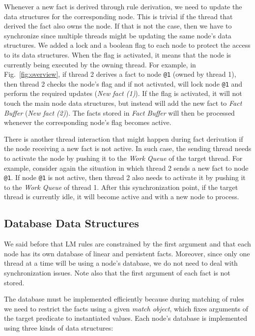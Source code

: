 Whenever a new fact is derived through rule derivation, we need to
update the data structures for the corresponding node. This is trivial
if the thread that derived the fact also owns the node. If that is not
the case, then we have to synchronize since multiple threads might be
updating the same node's data structures. We added a lock and a
boolean flag to each node to protect the access to its data
structures. When the flag is activated, it means that the node is
currently being executed by the owning thread. For example, in
Fig.~\ref{fig:overview}, if thread 2 derives a fact to
node \texttt{@1} (owned by thread 1), then thread 2 checks the node's
flag and if not activated, will lock node \texttt{@1} and perform the
required updates (\emph{New fact (1)}). If the flag is activated, it
will not touch the main node data structures, but instead will add the
new fact to \emph{Fact Buffer} (\emph{New fact (2)}). The facts stored
in \emph{Fact Buffer} will then be processed whenever the
corresponding node's flag becomes active.

There is another thread interaction that might happen during fact
derivation if the node receiving a new fact is not active. In such
case, the sending thread needs to activate the node by pushing it to
the \emph{Work Queue} of the target thread. For example, consider
again the situation in which thread 2 sends a new fact to
node \texttt{@1}. If node \texttt{@1} is not active, then thread 2
also needs to activate it by pushing it to the \emph{Work Queue} of
thread 1. After this synchronization point, if the target thread is
currently idle, it will become active and with a new node to process.


\subsection{Database Data Structures}
\label{sec:database}

We said before that LM rules are constrained by the first argument and
that each node has its own database of linear and persistent
facts. Moreover, since only one thread at a time will be using a
node's database, we do not need to deal with synchronization
issues. Note also that the first argument of each fact is not stored.

The database must be implemented efficiently because during matching
of rules we need to restrict the facts using a given \emph{match
object}, which fixes arguments of the target predicate to instantiated
values. Each node's database is implemented using three kinds of data
structures:

